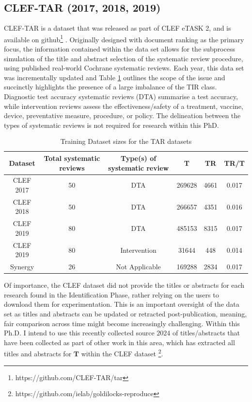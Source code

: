 \documentclass[10pt,oneside]{book}
\begin{document}
\subsection{CLEF-TAR (2017, 2018, 2019)}

CLEF-TAR is a dataset that was released as part of CLEF eTASK 2, and is available on github\footnote{https://github.com/CLEF-TAR/tar} \cite{kanoulas_clef_2017, kanoulas_clef_2018, kanoulas_clef_2019}. Originally designed with document ranking as the primary focus, the information contained within the data set allows for the subprocess simulation of the title and abstract selection of the systematic review procedure, using published real-world Cochrane systematic reviews. Each year, this data set was incrementally updated and Table \ref{tab:training_dataset_clef} outlines the scope of the issue and succinctly highlights the presence of a large imbalance of the TIR class. Diagnostic test accuracy systematic reviews (DTA) summarise a test accuracy, while intervention reviews assess the effectiveness/safety of a treatment, vaccine, device, preventative measure, procedure, or policy. The delineation between the types of systematic reviews is not required for research within this PhD.


\begin{table}
    \centering
    \begin{tabular}{|c|c|c|c|c|c|}
    \hline
        Dataset & Total systematic reviews & Type(s) of systematic review & T & TR & TR/T\\   \hline
        CLEF 2017 & 50 & DTA & 269628 & 4661  & 0.017 \\   \hline
        CLEF 2018 & 50 & DTA & 266657 & 4351 & 0.016\\   \hline
             CLEF   2019 & 80 & DTA & 485153 & 8315 & 0.017\\   \hline
               CLEF  2019 & 80 & Intervention & 31644 &  448 & 0.014 \\   \hline
Synergy & 26 & Not Applicable & 169288 &  2834 & 0.017 \\   \hline
    \end{tabular}
    \caption{Training Dataset sizes for the TAR datasets}
    \label{tab:training_dataset_clef}
\end{table}

Of importance, the CLEF dataset did not provide the titles or abstracts for each research found in the Identification Phase, rather relying on the users to download them for experimentation. This is an important oversight of the data set as titles and abstracts can be updated or retracted post-publication, meaning, fair comparison across time might become increasingly challenging. Within this Ph.D. I intend to use this recently collected source \(2024\) of titles/abstracts that have been collected as part of other work in this area, which has extracted all titles and abstracts for \(\textbf{T}\) within the CLEF dataset \cite{goharian_reproducibility_2024}\footnote{https://github.com/ielab/goldilocks-reproduce}.
\end{document}
